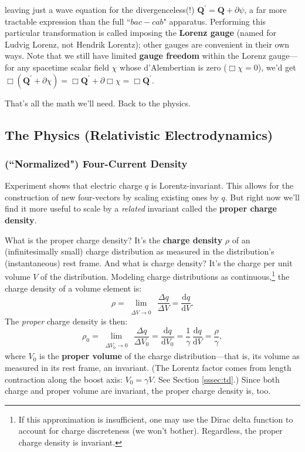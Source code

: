 \documentclass[12pt]{article}
\renewcommand{\vv}[1]{\mathbf{#1}}
\newcommand{\dd}[1]{\mathrm{d}#1}
\begin{document}
leaving just a wave equation for the divergenceless(!) $\vv Q^\prime = \vv Q + \partialup \psi$, a far more tractable expression than the full ``$bac - cab$" apparatus. Performing this particular transformation is called imposing the \textbf{Lorenz gauge} (named for Ludvig Lorenz, not Hendrik Lorentz); other gauges are convenient in their own ways. Note that we still have limited \textbf{gauge freedom} within the Lorenz gauge---for any spacetime scalar field $\chi$ whose d'Alembertian is zero (${\Box \chi = 0}$), we'd get $\Box ( \vv Q^\prime + \partialup \chi ) = \Box \vv Q^\prime + \partialup \Box \chi = \Box \vv Q^\prime$.

That's all the math we'll need. Back to the physics.



\subsection{The Physics (Relativistic Electrodynamics)}

\subsubsection[("Normalized") Four-Current Density]{(``Normalized") Four-Current Density}

Experiment shows that electric charge $q$ is Lorentz-invariant. This allows for the construction of new four-vectors by scaling existing ones by $q$. But right now we'll find it more useful to scale by a \emph{related} invariant called the \textbf{proper charge density}.

What is the proper charge density? It's the \textbf{charge density} $\rho$ of an (infinitesimally small) charge distribution as measured in the distribution's (instantaneous) rest frame. And what is charge density? It's the charge per unit volume $V$ of the distribution. Modeling charge distributions as continuous,\footnote{\label{fn:ddf}If this approximation is insufficient, one may use the Dirac delta function to account for charge discreteness (we won't bother). Regardless, the proper charge density is invariant.} the charge density of a volume element is:
\begin{equation*}
\rho = \lim\limits_{\substack{\\ \Delta V \to 0}} \, \dfrac{\Delta q}{\Delta V} = \dfrac{\dd q}{\dd V} .
\end{equation*}
The \emph{proper} charge density is then:
\begin{equation*}
\rho_0 = \lim\limits_{\substack{\\ \Delta V_0 \to 0}} \, \dfrac{\Delta q}{\Delta V_0} = \dfrac{\dd q}{\dd V_0} = \dfrac{1}{\gamma} \, \dfrac{\dd q}{\dd V} = \dfrac{\rho}{\gamma},
\end{equation*}
where $V_0$ is the \textbf{proper volume} of the charge distribution---that is, its volume as measured in its rest frame, an invariant. (The Lorentz factor comes from length contraction along the boost axis: $V_0 = \gamma V$. See Section \ref{sssec:td}.) Since both charge and proper volume are invariant, the proper charge density is, too.
\end{document}
